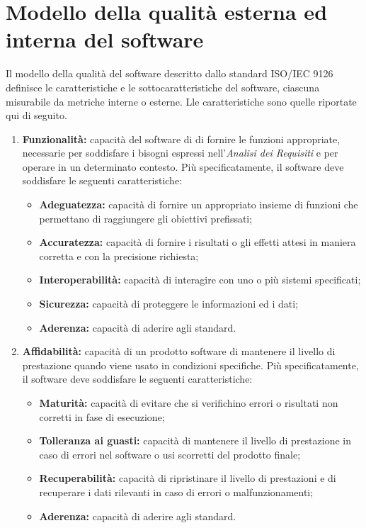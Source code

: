 \section{Modello della qualità esterna ed interna del software} \label{5.1}
Il modello della qualità del software descritto dallo standard ISO/IEC 9126 definisce le caratteristiche e le sottocaratteristiche del software, ciascuna misurabile da metriche interne o esterne. Lle caratteristiche sono quelle riportate qui di seguito.
\begin{enumerate}
	\item \textbf{Funzionalità:} capacità del software di di fornire le funzioni appropriate, necessarie per soddisfare i bisogni espressi nell’\textit{Analisi dei Requisiti} e per operare in un determinato contesto. Più specificatamente, il software deve soddisfare le seguenti caratteristiche:  
 	\begin{itemize}
 		\item \textbf{Adeguatezza:} capacità di fornire un appropriato insieme di funzioni che permettano di raggiungere gli obiettivi prefissati;
 		\item \textbf{Accuratezza:} capacità di fornire i risultati o gli effetti attesi in maniera corretta e con la precisione richiesta;
 		\item \textbf{Interoperabilità:} capacità di interagire con uno o più sistemi specificati;
 		\item \textbf{Sicurezza:} capacità di proteggere le informazioni ed i dati;
 		\item \textbf{Aderenza:} capacità di aderire agli standard.
 	\end{itemize}
 	\item \textbf{Affidabilità:} capacità di un prodotto software di mantenere il livello di prestazione quando viene usato in condizioni specifiche. Più specificatamente, il software deve soddisfare le seguenti caratteristiche: 
 	\begin{itemize}
 		\item \textbf{Maturità:} capacità di evitare che si verifichino errori o risultati non corretti in fase di esecuzione;
 		\item \textbf{Tolleranza ai guasti:} capacità di mantenere il livello di prestazione in caso di errori nel software o usi scorretti del prodotto finale;
 		\item \textbf{Recuperabilità:} capacità di ripristinare il livello di prestazioni e di recuperare i dati rilevanti in caso di errori o malfunzionamenti;
 		\item \textbf{Aderenza:} capacità di aderire agli standard.

\end{itemize}
\end{enumerate}
